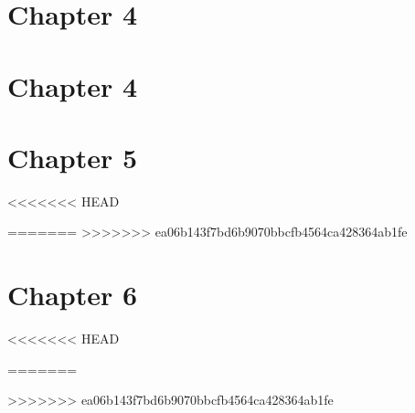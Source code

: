 \documentclass{wileySix}
\begin{document}
\chapter{Chapter 4}


%
%
%
%
%
%
%
%
%
%
%
%
%
%
%

\chapter{Chapter 4}

%
%
%
%
%
%
%
%
%
%
%
%
%
%
%


\chapter{Chapter 5}

%
%
%
%
%
%
%
<<<<<<< HEAD

=======
%
>>>>>>> ea06b143f7bd6b9070bbcfb4564ca428364ab1fe

\chapter{Chapter 6}







<<<<<<< HEAD

=======

>>>>>>> ea06b143f7bd6b9070bbcfb4564ca428364ab1fe
\end{document}
